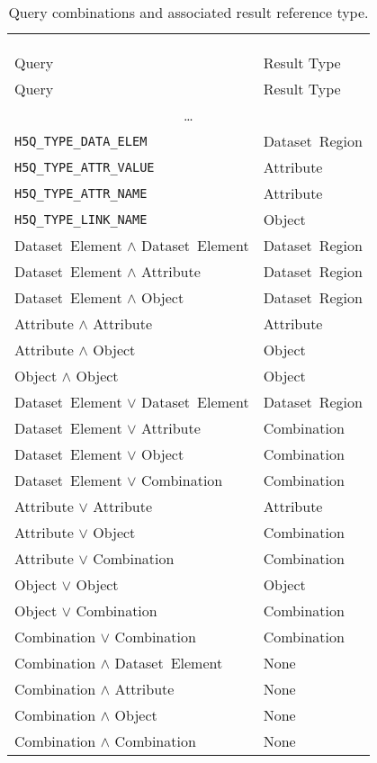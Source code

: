 \begin{longtable}{ll}
\vspace{-30pt}\\
\caption{Query combinations and associated result reference type.}\\
\label{tab:querycomb} \vspace{-10pt} \\
\toprule
Query & Result Type\\ \midrule
\endfirsthead
\toprule
Query & Result Type\\ \midrule
\endhead
\multicolumn{2}{c}{\ldots}\\
\bottomrule
\endfoot
\bottomrule
\endlastfoot
\texttt{H5Q\_TYPE\_DATA\_ELEM} & Dataset~Region \\
\texttt{H5Q\_TYPE\_ATTR\_VALUE} & Attribute \\
\texttt{H5Q\_TYPE\_ATTR\_NAME} & Attribute \\
\texttt{H5Q\_TYPE\_LINK\_NAME} & Object \\
Dataset~Element $\mathrm{\land}$ Dataset~Element & Dataset~Region \\
Dataset~Element $\mathrm{\land}$ Attribute & Dataset~Region \\
Dataset~Element $\mathrm{\land}$ Object & Dataset~Region \\
Attribute $\mathrm{\land}$ Attribute & Attribute \\
Attribute $\mathrm{\land}$ Object & Object \\
Object $\mathrm{\land}$ Object & Object \\
Dataset~Element $\mathrm{\lor}$ Dataset~Element & Dataset~Region \\
Dataset~Element $\mathrm{\lor}$ Attribute & Combination \\
Dataset~Element $\mathrm{\lor}$ Object & Combination \\
Dataset~Element $\mathrm{\lor}$ Combination & Combination \\
Attribute $\mathrm{\lor}$ Attribute & Attribute \\
Attribute $\mathrm{\lor}$ Object & Combination \\
Attribute $\mathrm{\lor}$ Combination & Combination \\
Object $\mathrm{\lor}$ Object & Object \\
Object $\mathrm{\lor}$ Combination & Combination \\
Combination $\mathrm{\lor}$ Combination & Combination \\
Combination $\mathrm{\land}$ Dataset~Element & None \\
Combination $\mathrm{\land}$ Attribute & None \\
Combination $\mathrm{\land}$ Object & None \\
Combination $\mathrm{\land}$ Combination & None \\
\end{longtable}


